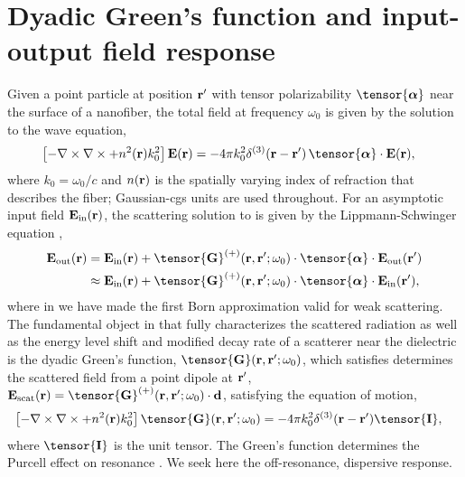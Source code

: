 \documentclass[preprint,aps,pra,onecolumn]{revtex4-1} %
\newcommand{\inp}{{\rm in}}
\newcommand{\out}{{\rm out}}
\newcommand{\unittens}{\tensor{\mathbf{I}}}
\begin{document}
\section{Dyadic Green's function and input-output field response}

Given a point particle at position $\mathbf{r}'$ with tensor polarizability $\tensor{\boldsymbol{\alpha}}$ near the surface of a nanofiber, the total field  at frequency $\omega_0$ is given by the solution to the wave equation, 
	\begin{align}\label{Eq::WaveEquationSource}
		\left[ - \nabla \times\nabla \times + n^2(\br)k_0^2 \right] \mathbf{E}(\br) &= -4\pi  k_0^2 \delta^{(3)}(\br-\br')\,  \tensor{\boldsymbol{\alpha}}\cdot \mathbf{E}(\br),
	\end{align}
where $k_0=\omega_0/c$ and $n(\mathbf{r})$ is the spatially varying index of refraction that describes the fiber; Gaussian-cgs units are used throughout.  For an asymptotic input field $\mathbf{E}_{\inp}(\br)$, the scattering solution to  is given by the Lippmann-Schwinger equation \cite{wubs_multiple-scattering_2004},
	\begin{align}
		\mathbf{E}_{\out}(\br) &=\mathbf{E}_{\inp}(\br)+\tensor{\mathbf{G}}^{(+)}(\br , \br'; \omega_0)\cdot 
\tensor{\boldsymbol{\alpha}}\cdot \mathbf{E}_{\out}(\br')\\
		&\approx \mathbf{E}_{\inp}(\br)+ \tensor{\mathbf{G}}^{(+)}(\br , \br'; \omega_0) \cdot 
\tensor{\boldsymbol{\alpha}}\cdot \mathbf{E}_{\inp}(\br'), \label{Eq::ScatteredField}
	\end{align}
where in  we have made the first Born approximation valid for weak scattering. The fundamental object in that fully characterizes the scattered radiation as well as the energy level shift and modified decay rate of a scatterer near the dielectric is the dyadic Green's function, $\tensor{\mathbf{G}}(\br, \br';\omega_0)$, which satisfies determines the scattered field from a point dipole at $\mathbf{r}'$, $\mathbf{E}_{\rm scat}(\br)= \tensor{\mathbf{G}}^{(+)}(\br , \br'; \omega_0)\cdot \mathbf{d}$, satisfying the equation of motion,
	\begin{align} \label{Eq::GreensDiffEq}
		\left[ -\nabla\times\nabla\times + n^2(\mbf{r}) k_0^2 \right] \tensor{\mathbf{G}}(\br, \br';\omega_0) &= -4\pi 
k_0^2 \delta^{(3)}(\mathbf{r}-\mathbf{r}') \unittens,
	\end{align}
where $\unittens$ is the unit tensor.  The Green's function determines the Purcell effect on resonance \cite{}.  We seek here the off-resonance, dispersive response.  
\end{document}
